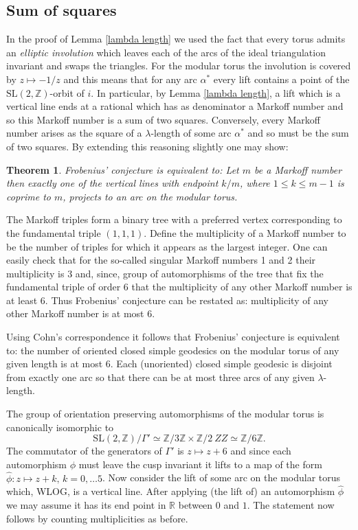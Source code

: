 \documentclass[12pt,a4paper]{amsart}
\newtheorem{thm}{Theorem}[section]
\def\ZZ{\mathbb{Z}}
\def\RR{\mathbb{R}}
\def\sl2{\mathrm{SL}(2, \ZZ)}
\begin{document}
\subsection{Sum of squares}\label{frobenius}


In the proof of Lemma \ref{lambda length} 
we used the fact that
every torus admits an \textit{elliptic involution}
which leaves each of the arcs of the ideal triangulation  invariant
 and swaps the triangles.
For the modular torus the involution is covered by $z \mapsto -1/z$ 
and  this means that for any arc $\alpha^*$ every lift contains a point 
of the $\sl2$-orbit of $i$.
 In particular, by Lemma \ref{lambda length},
 a lift which is a vertical line ends at a rational 
 which has as denominator a Markoff number
 and so this Markoff number is a sum of two squares.
 Conversely, every Markoff number arises as the square of a $\lambda$-length
 of some arc  $\alpha^*$ and so must be the sum of two squares.
 By extending this reasoning slightly one may show:
 
 \begin{thm}
Frobenius' conjecture is equivalent to:
Let $m$ be a Markoff number then exactly one of the vertical lines
with endpoint  $k/m$, where $1\leq k \leq m-1$ is coprime to $m$,
projects to an arc on the modular torus.
\end{thm}

\proof The Markoff triples form a binary tree with a preferred vertex corresponding to
the fundamental triple $(1,1,1)$. 
Define the multiplicity of a Markoff number to be the  number of triples for which
it appears as the largest integer.
One can easily check that for the so-called singular Markoff numbers 1 and 2
their multiplicity is 3
and, since,
group of automorphisms of the tree that fix the fundamental triple of order 6
that the multiplicity of any other Markoff number is at least $6$.
Thus Frobenius' conjecture can be restated as:
multiplicity of any other Markoff number is at most $6$.

Using Cohn's correspondence it follows that Frobenius' conjecture
is equivalent to: 
the number of oriented closed simple geodesics on the modular torus
of any given length is at most 6.
Each (unoriented) closed simple geodesic is disjoint from exactly one arc
so that there can be at most three arcs of any given $\lambda$-length.

The group of orientation preserving  automorphisms of the modular torus 
is canonically isomorphic to 
$$\sl2 / \Gamma' \simeq \ZZ/3\ZZ \times \ZZ/2\ ZZ \simeq \ZZ/6\ZZ .$$
The commutator of the generators of $ \Gamma'$  is $z \mapsto z + 6$
and since each automorphism $\phi$ must leave the cusp invariant it lifts to
a map of the form $\hat{\phi} : z \mapsto z + k,\, k= 0,\dots 5$.
Now consider the lift of some arc on the modular torus 
which, WLOG, is a vertical line. 
After applying (the lift of)  an automorphism $\hat{\phi}$ 
we may assume it has its end point in $\RR$ between $0$ and $1$.
The statement now follows by counting multiplicities as before.
\end{document}
